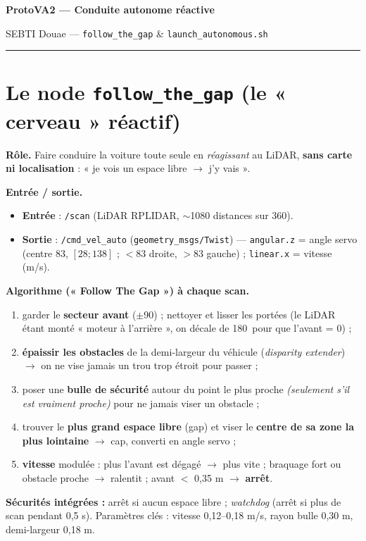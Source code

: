 \documentclass[a4paper,10pt]{article}
\begin{document}
{\centering\Large\bfseries\color{primary}
ProtoVA2 --- Conduite autonome réactive\par}
{\centering\small SEBTI Douae --- \texttt{follow\_the\_gap} \& \texttt{launch\_autonomous.sh}\par}
\vspace{4pt}\hrule\vspace{6pt}

\section{Le node \texttt{follow\_the\_gap} (le « cerveau » réactif)}
\textbf{Rôle.} Faire conduire la voiture toute seule en \emph{réagissant} au LiDAR,
\textbf{sans carte ni localisation} : « je vois un espace libre $\rightarrow$ j'y vais ».

\textbf{Entrée / sortie.}
\begin{itemize}
  \item \textbf{Entrée} : \texttt{/scan} (LiDAR RPLIDAR, $\sim$1080 distances sur 360\textdegree).
  \item \textbf{Sortie} : \texttt{/cmd\_vel\_auto} (\texttt{geometry\_msgs/Twist}) ---
        \texttt{angular.z} = angle servo (centre 83, $[28;138]$ ; $<$83 droite, $>$83 gauche) ;
        \texttt{linear.x} = vitesse (m/s).
\end{itemize}

\textbf{Algorithme (« Follow The Gap ») à chaque scan.}
\begin{enumerate}
  \item garder le \textbf{secteur avant} ($\pm$90\textdegree) ; nettoyer et lisser les portées
        (le LiDAR étant monté « moteur à l'arrière », on décale de 180\textdegree\ pour que l'avant = 0\textdegree) ;
  \item \textbf{épaissir les obstacles} de la demi-largeur du véhicule (\emph{disparity extender})
        $\rightarrow$ on ne vise jamais un trou trop étroit pour passer ;
  \item poser une \textbf{bulle de sécurité} autour du point le plus proche \emph{(seulement
        s'il est vraiment proche)} pour ne jamais viser un obstacle ;
  \item trouver le \textbf{plus grand espace libre} (gap) et viser le \textbf{centre de sa zone
        la plus lointaine} $\rightarrow$ cap, converti en angle servo ;
  \item \textbf{vitesse} modulée : plus l'avant est dégagé $\rightarrow$ plus vite ; braquage fort
        ou obstacle proche $\rightarrow$ ralentit ; avant $<$ 0,35 m $\rightarrow$ \textbf{arrêt}.
\end{enumerate}
\textbf{Sécurités intégrées :} arrêt si aucun espace libre ; \emph{watchdog} (arrêt si plus de
scan pendant 0,5 s). Paramètres clés : vitesse 0,12--0,18 m/s, rayon bulle 0,30 m,
demi-largeur 0,18 m.
\end{document}
